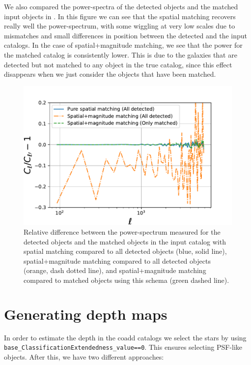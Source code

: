 \documentclass[\docopts]{\docclass}
\begin{document}
We also compared the power-spectra of the detected objects and the matched input objects in . In this figure we can see that the spatial matching recovers really well the power-spectrum, with some wiggling at very low scales due to mismatches and small differences in position between the detected and the input catalogs. In the case of spatial+magnitude matching, we see that the power for the matched catalog is consistently lower. This is due to the galaxies that are detected but not matched to any object in the true catalog, since this effect disappears when we just consider the objects that have been matched.

\begin{figure}
\centering
\includegraphics[width=0.9\columnwidth]{cl_comparison_matching.pdf}
\caption{Relative difference between the power-spectrum measured for the detected objects and the matched objects in the input catalog with spatial matching compared to all detected objects (blue, solid line), spatial+magnitude matching compared to all detected objects (orange, dash dotted line), and spatial+magnitude matching compared to matched objects using this schema (green dashed line).}
\label{fig:matching_cls}
\end{figure}
 

\section{Generating depth maps}
\label{sec:masking}

In order to estimate the depth in the coadd catalogs we select the stars by using \texttt{base\_ClassificationExtendedness\_value==0}. This ensures selecting
PSF-like objects. After this, we have two different approaches:
\end{document}
